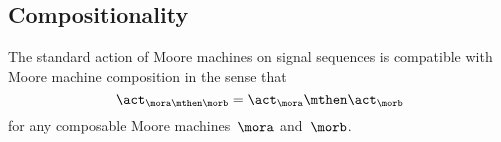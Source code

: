 
\subsection{Compositionality}

\begin{proposition}
    \label{prop:moore-action-is-a-morphism}
    The standard action of Moore machines on signal sequences is compatible with Moore machine composition in the sense that
    \begin{equation}
        \label{eq:moore-action-compositional}
        \act_{\mora \mthen \morb} = \act_\mora \mthen \act_\morb
    \end{equation}
    for any composable Moore machines~$\mora$ and~$\morb$.
\end{proposition}

